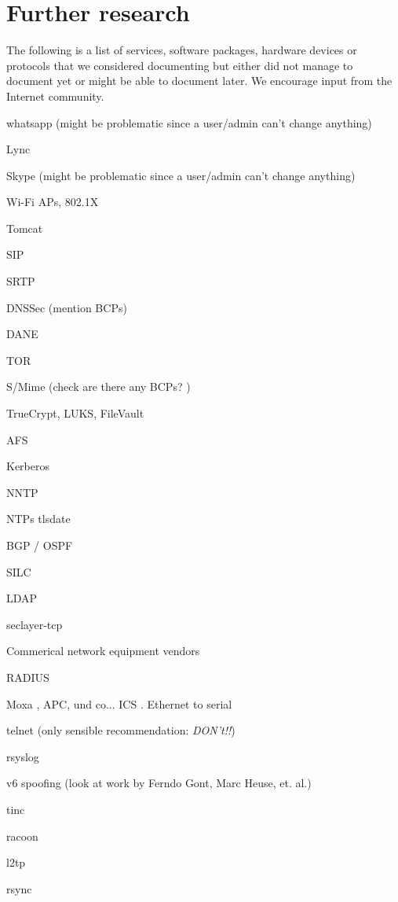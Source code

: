 \chapter{Further research}
\label{cha:further-research}
The following is a list of services, software packages, hardware devices or protocols that we considered documenting but either did not manage to document yet or might be able to document later. We encourage input from the Internet community. 

\begin{multicols}{3}
\begin{itemize*}
  \item whatsapp (might be problematic since a user/admin can't change anything)
  \item Lync
  \item Skype (might be problematic since a user/admin can't change anything)
  \item Wi-Fi APs, 802.1X
  \item Tomcat
  \item SIP
  \item SRTP
  \item DNSSec (mention BCPs)
  \item DANE
  \item TOR
  \item S/Mime (check are there any BCPs? )
  \item TrueCrypt, LUKS, FileVault
  \item AFS
  \item Kerberos
  \item NNTP
  \item NTPs tlsdate
  \item BGP / OSPF
  \item SILC
  \item LDAP
  \item seclayer-tcp
  \item Commerical network equipment vendors
  \item RADIUS
  \item Moxa , APC, und co... ICS . Ethernet to serial
  \item telnet (only sensible recommendation: \emph{DON't!!})
  \item rsyslog
  \item v6 spoofing (look at work by Ferndo Gont, Marc Heuse, et. al.)
  \item tinc
  \item racoon
  \item l2tp
  \item rsync

\end{itemize*}
\end{multicols}
